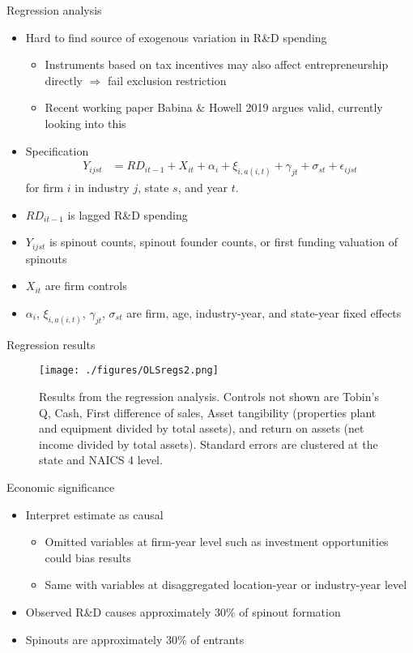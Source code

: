 \documentclass[english,usenames,dvipsnames]{beamer}
\begin{document}
\begin{frame}{Regression analysis}
\begin{itemize}
	\item Hard to find source of exogenous variation in R\&D spending
	\begin{itemize}
		\item Instruments based on tax incentives may also affect entrepreneurship directly $\Rightarrow$ fail exclusion restriction
		\item Recent working paper Babina \& Howell 2019 argues valid, currently looking into this
	\end{itemize}
	\item Specification
	\begin{align*}
	Y_{ijst} &= RD_{it-1} + X_{it} + \alpha_i + \xi_{i,a(i,t)} +  \gamma_{jt} + \sigma_{st} + \epsilon_{ijst}
	\end{align*}
	for firm $i$ in industry $j$, state $s$, and year $t$.
	\item $RD_{it-1}$ is lagged R\&D spending
	\item $Y_{ijst}$ is spinout counts, spinout founder counts, or first funding valuation of spinouts
	\item $X_{it}$ are firm controls
	\item $\alpha_i$, $\xi_{i,a(i,t)}$, $\gamma_{jt}$, $\sigma_{st}$ are firm, age, industry-year, and state-year fixed effects
\end{itemize}
\end{frame}

\begin{frame}{Regression results}
\begin{figure}
	\texttt{[image: ./figures/OLSregs2.png]}
	\caption{\scriptsize Results from the regression analysis. Controls not shown are Tobin's Q, Cash, First difference of sales, Asset tangibility (properties plant and equipment divided by total assets), and return on assets (net income divided by total assets). Standard errors are clustered at the state and NAICS 4 level.}
\end{figure}
\end{frame}


\begin{frame}{Economic significance}
\begin{itemize}
	\item Interpret estimate as causal
	\begin{itemize}
		\item Omitted variables at firm-year level such as investment opportunities could bias results 
		\item Same with variables at disaggregated location-year or industry-year level
	\end{itemize}
	\item Observed R\&D causes approximately 30\% of spinout formation
	\item Spinouts are approximately 30\% of entrants
\end{itemize}
\end{frame}
\end{document}
